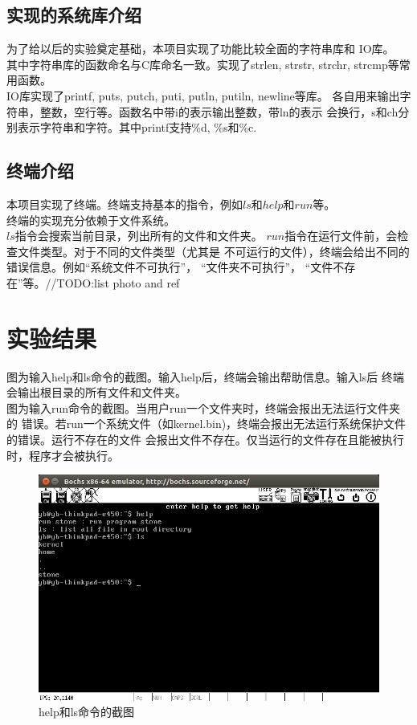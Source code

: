 \documentclass[a4paper]{article}
\begin{document}
    \subsection{实现的系统库介绍}
    为了给以后的实验奠定基础，本项目实现了功能比较全面的字符串库和
    IO库。\\
    
    其中字符串库的函数命名与C库命名一致。实现了strlen, strstr, 
    strchr, strcmp等常用函数。\\
    
    IO库实现了printf, puts, putch, puti, putln, putiln, newline等库。
    各自用来输出字符串，整数，空行等。函数名中带i的表示输出整数，带ln的表示
    会换行，s和ch分别表示字符串和字符。其中printf支持\%d, \%s和\%c.
    \subsection{终端介绍}
    本项目实现了终端。终端支持基本的指令，例如$ls$和$help$和$run$等。\\
    
    终端的实现充分依赖于文件系统。\\
    $ls$指令会搜索当前目录，列出所有的文件和文件夹。
    $run$指令在运行文件前，会检查文件类型。对于不同的文件类型（尤其是
    不可运行的文件），终端会给出不同的错误信息。例如``系统文件不可执行''， 
    ``文件夹不可执行''， ``文件不存在''等。//TODO:list photo and ref
\section{实验结果} 
    图\label{fig:helpls}为输入help和ls命令的截图。输入help后，终端会输出帮助信息。输入ls后
    终端会输出根目录的所有文件和文件夹。\\
    
    图\label{fig:runfiles}为输入run命令的截图。当用户run一个文件夹时，终端会报出无法运行文件夹的
    错误。若run一个系统文件（如kernel.bin)，终端会报出无法运行系统保护文件的错误。运行不存在的文件
    会报出文件不存在。仅当运行的文件存在且能被执行时，程序才会被执行。

    
    \begin{figure}[!htb]
        \begin{center}
        \includegraphics[scale=0.5]{asset/helpls.png}
        \caption{help和ls命令的截图\label{fig:helpls}} 
        \end{center} 
    \end{figure} 
\end{document}
